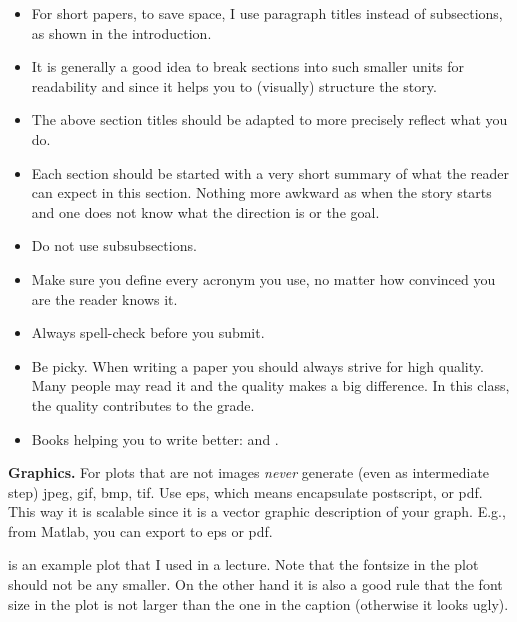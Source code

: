 \documentclass[letterpaper]{article}
\newcommand{\mypar}[1]{{\bf #1.}}
\begin{document}
\begin{itemize}
\item For short papers, to save space, I use paragraph titles instead of
subsections, as shown in the introduction.

\item It is generally a good idea to break sections into such smaller
units for readability and since it helps you to (visually) structure the story.

\item The above section titles should be adapted to more precisely
reflect what you do.

\item Each section should be started with a very
short summary of what the reader can expect in this section. Nothing
more awkward as when the story starts and one does not know what the
direction is or the goal.

\item Do not use subsubsections.

\item Make sure you define every acronym you use, no matter how
convinced you are the reader knows it.

\item Always spell-check before you submit.

\item Be picky. When writing a paper you should always strive for 
high quality. Many people may read it and the quality makes a big difference.
In this class, the quality contributes to the grade.

\item Books helping you to write better: \cite{Higham:98} and \cite{Strunk:00}.
\end{itemize}

\mypar{Graphics} For plots that are not images {\em never} generate (even as intermediate step)
jpeg, gif, bmp, tif. Use eps, which means encapsulate postscript, or pdf. This way it is
scalable since it is a vector graphic description of your graph. E.g.,
from Matlab, you can export to eps or pdf.

 is an example plot that I used in a lecture. Note that the fontsize in the plot should not be any smaller. On the other hand it is also a good rule that the font size in the plot is not larger than the one in the caption (otherwise it looks ugly).
\end{document}
